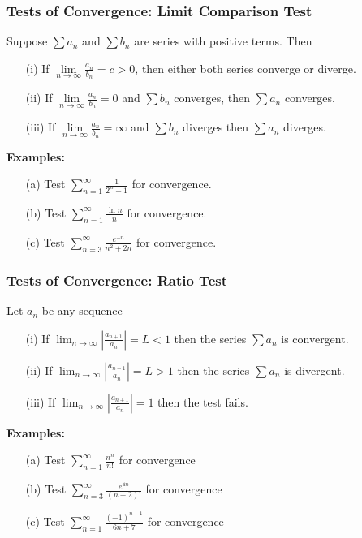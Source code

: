 \documentclass{beamer}
\begin{document}
\begin{frame}
\frametitle{Tests of Convergence: Limit Comparison Test}
Suppose $\sum a_n$ and $\sum  b_n$ are series with positive terms. Then
\begin{itemize}
	\item[(i)] If $\lim\limits_{n \to \infty} \frac{a_n}{b_n} = c> 0$, then either both series converge or diverge.
	\item[(ii)] If $\lim\limits_{n \to \infty} \frac{a_n}{b_n} =  0$ and $\sum  b_n$ converges, then $\sum  a_n$ converges.
	\item[(iii)] If $\lim\limits_{n \to \infty} \frac{a_n}{b_n} =  \infty$ and $\sum  b_n$ diverges then $\sum a_n$ diverges.
\end{itemize}

\vspace{12pt}
\textbf{Examples:}
\begin{itemize}
	\item[(a)] Test $\sum_{n=1}^\infty \frac{1}{2^n-1}$ for convergence.
	\item[(b)] Test $\sum_{n=1}^\infty \frac{\ln n}{n}$ for convergence.
	\item[(c)] Test $\sum_{n=3}^\infty \frac{e^{-n}}{n^2 + 2n}$ for convergence.
\end{itemize}
\end{frame}

\begin{frame}
\frametitle{Tests of Convergence: Ratio Test}
Let $a_n$ be any sequence
\begin{itemize}
	\item[(i)] If $\lim_{n\to \infty} |\frac{a_{n+1}}{a_n}| = L < 1$ then the series $\sum a_n$ is convergent.
	\item[(ii)] If $\lim_{n\to \infty} |\frac{a_{n+1}}{a_n}| = L > 1$ then the series $\sum a_n$ is divergent.
	\item[(iii)] If $\lim_{n\to \infty} |\frac{a_{n+1}}{a_n}| =  1$ then the test fails.
\end{itemize}

\vspace{12pt}
\textbf{Examples:}
\begin{itemize}
	\item[(a)] Test $\sum_{n=1}^\infty \frac{n^n}{n!}$ for convergence
	\item[(b)] Test $\sum_{n=3}^\infty \frac{e^{4n}}{(n-2)!}$ for convergence
	\item[(c)] Test $\sum_{n=1}^\infty \frac{(-1)^{n+1}}{6n+7}$ for convergence
\end{itemize}
\end{frame}
\end{document}
